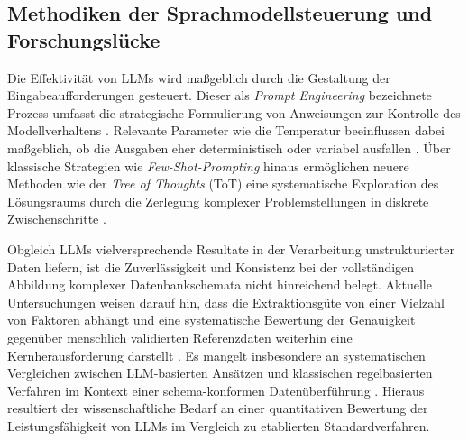 \subsection{Methodiken der Sprachmodellsteuerung und Forschungslücke}
Die Effektivität von LLMs wird maßgeblich durch die Gestaltung der Eingabeaufforderungen gesteuert. Dieser als \textit{Prompt Engineering} bezeichnete Prozess umfasst die 
strategische Formulierung von Anweisungen zur Kontrolle des Modellverhaltens \parencite[vgl.][S. 5]{boonstra_prompt}. Relevante Parameter wie die Temperatur beeinflussen dabei 
maßgeblich, ob die Ausgaben eher deterministisch oder variabel ausfallen \parencite[vgl.][S. 9f.]{boonstra_prompt}. Über klassische Strategien wie \textit{Few-Shot-Prompting} 
hinaus ermöglichen neuere Methoden wie der \textit{Tree of Thoughts} (ToT) eine systematische Exploration des Lösungsraums durch die Zerlegung komplexer Problemstellungen 
in diskrete Zwischenschritte \parencite[vgl.][S. 3f.]{tot2023}.

Obgleich LLMs vielversprechende Resultate in der Verarbeitung unstrukturierter Daten liefern, ist die Zuverlässigkeit und Konsistenz bei der vollständigen Abbildung 
komplexer Datenbankschemata nicht hinreichend belegt. Aktuelle Untersuchungen weisen darauf hin, dass die Extraktionsgüte von einer Vielzahl von Faktoren abhängt und eine 
systematische Bewertung der Genauigkeit gegenüber menschlich validierten Referenzdaten weiterhin eine Kernherausforderung darstellt \parencite[vgl.][S. 1283]{data_extraction_ai}. 
Es mangelt insbesondere an systematischen Vergleichen zwischen LLM-basierten Ansätzen und klassischen regelbasierten Verfahren im Kontext einer schema-konformen Datenüberführung 
\parencite[vgl.][S. 1283]{data_extraction_ai}. Hieraus resultiert der wissenschaftliche Bedarf an einer quantitativen Bewertung der Leistungsfähigkeit von LLMs im Vergleich zu etablierten 
Standardverfahren.